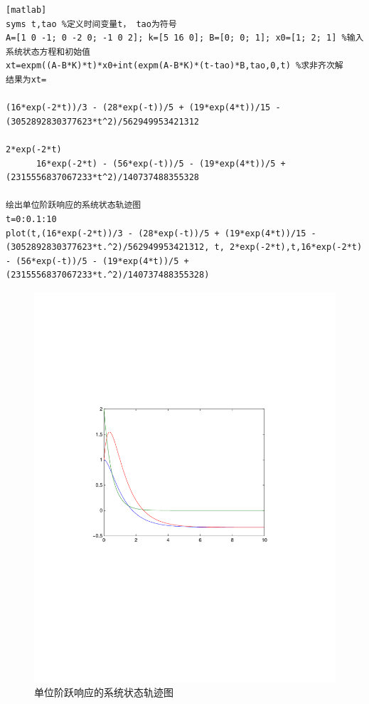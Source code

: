 \documentclass[a4paper]{article}
\begin{document}
\begin{verbatim}[matlab]
syms t,tao %定义时间变量t， tao为符号
A=[1 0 -1; 0 -2 0; -1 0 2]; k=[5 16 0]; B=[0; 0; 1]; x0=[1; 2; 1] %输入系统状态方程和初始值
xt=expm((A-B*K)*t)*x0+int(expm(A-B*K)*(t-tao)*B,tao,0,t) %求非齐次解
结果为xt=
 
(16*exp(-2*t))/3 - (28*exp(-t))/5 + (19*exp(4*t))/15 - (3052892830377623*t^2)/562949953421312
                                                                                   2*exp(-2*t)
      16*exp(-2*t) - (56*exp(-t))/5 - (19*exp(4*t))/5 + (2315556837067233*t^2)/140737488355328

绘出单位阶跃响应的系统状态轨迹图
t=0:0.1:10
plot(t,(16*exp(-2*t))/3 - (28*exp(-t))/5 + (19*exp(4*t))/15 - (3052892830377623*t.^2)/562949953421312, t, 2*exp(-2*t),t,16*exp(-2*t) - (56*exp(-t))/5 - (19*exp(4*t))/5 + (2315556837067233*t.^2)/140737488355328)
\end{verbatim}
\begin{figure}[h]  %
\centering
\includegraphics{num6} 
\caption{单位阶跃响应的系统状态轨迹图}
\end{figure}
\end{document}
